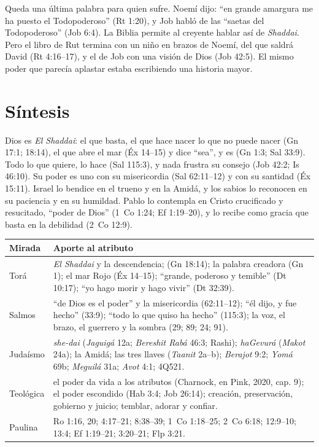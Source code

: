 Queda una última palabra para quien sufre. Noemí dijo: ``en grande amargura me ha puesto el Todopoderoso'' (Rt 1:20), y Job habló de las ``saetas del Todopoderoso'' (Job 6:4). La Biblia permite al creyente hablar así de \emph{Shaddai}. Pero el libro de Rut termina con un niño en brazos de Noemí, del que saldrá David (Rt 4:16--17), y el de Job con una visión de Dios (Job 42:5). El mismo poder que parecía aplastar estaba escribiendo una historia mayor.

\section{Síntesis}

\begin{center}
\begin{tcolorbox}[colback=papiro,colframe=azul,boxrule=1pt,arc=3pt,width=0.95\linewidth]
Dios es \emph{El Shaddai}: el que basta, el que hace nacer lo que no puede nacer (Gn 17:1; 18:14), el que abre el mar (Éx 14--15) y dice ``sea'', y es (Gn 1:3; Sal 33:9). Todo lo que quiere, lo hace (Sal 115:3), y nada frustra su consejo (Job 42:2; Is 46:10). Su poder es uno con su misericordia (Sal 62:11--12) y con su santidad (Éx 15:11). Israel lo bendice en el trueno y en la Amidá, y los sabios lo reconocen en su paciencia y en su humildad. Pablo lo contempla en Cristo crucificado y resucitado, ``poder de Dios'' (1~Co 1:24; Ef 1:19--20), y lo recibe como gracia que basta en la debilidad (2~Co 12:9).
\end{tcolorbox}
\end{center}

\begin{center}\small\renewcommand{\arraystretch}{1.25}
\begin{tabular}{@{}L{2.6cm}L{11.8cm}@{}}
\toprule
\textbf{Mirada} & \textbf{Aporte al atributo} \\ \midrule
Torá & \emph{El Shaddai} y la descendencia;  (Gn 18:14); la palabra creadora (Gn 1); el mar Rojo (Éx 14--15); ``grande, poderoso y temible'' (Dt 10:17); ``yo hago morir y hago vivir'' (Dt 32:39). \\
Salmos & ``de Dios es el poder'' y la misericordia (62:11--12); ``él dijo, y fue hecho'' (33:9); ``todo lo que quiso ha hecho'' (115:3); la voz, el brazo, el guerrero y la sombra (29; 89; 24; 91). \\
Judaísmo & \emph{she-dai} (\emph{Jaguigá} 12a; \emph{Bereshit Rabá} 46:3; Rashi); \emph{haGevurá} (\emph{Makot} 24a); la Amidá; las tres llaves (\emph{Taanit} 2a--b); \emph{Berajot} 9:2; \emph{Yomá} 69b; \emph{Meguilá} 31a; \emph{Avot} 4:1; 4Q521. \\
Teológica & el poder da vida a los atributos (Charnock, en Pink, 2020, cap. 9); el poder escondido (Hab 3:4; Job 26:14); creación, preservación, gobierno y juicio; temblar, adorar y confiar. \\
Paulina & Ro 1:16, 20; 4:17--21; 8:38--39; 1~Co 1:18--25; 2~Co 6:18; 12:9--10; 13:4; Ef 1:19--21; 3:20--21; Flp 3:21. \\
\bottomrule
\end{tabular}\end{center}

